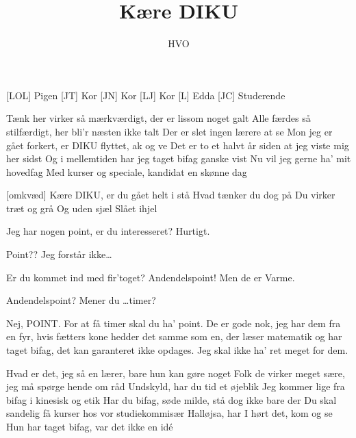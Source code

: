 \documentclass[a4paper,11pt]{article}
\title{Kære DIKU}
\author{HVO}
\begin{document}
\maketitle

\begin{roles}
[LOL] Pigen
[JT] Kor
[JN] Kor
[LJ] Kor
[L] Edda
[JC] Studerende
\end{roles}

\begin{song}

 Tænk her virker så mærkværdigt, der er lissom noget galt
  Alle færdes så stilfærdigt, her bli'r næsten ikke talt
  Der er slet ingen lærere at se
  Mon jeg er gået forkert, er DIKU flyttet, ak og ve
  Det er to et halvt år siden at jeg viste mig her sidst
  Og i mellemtiden har jeg taget bifag ganske vist
  Nu vil jeg gerne ha' mit hovedfag
  Med kurser og speciale, kandidat en skønne dag

[omkvæd] Kære DIKU, er du gået helt i stå
  Hvad tænker du dog på
  Du virker træt og grå
  Og uden sjæl
  Slået ihjel

\end{song}

\begin{sketch}


 Jeg har nogen point, er du interesseret?  Hurtigt.

 Point?? Jeg forstår ikke\ldots

 Er du kommet ind med fir'toget?  Andendelspoint!  Men de er Varme.

 Andendelspoint?  Mener du \ldots timer?

 Nej, POINT.  For at få timer skal du ha' point.  De er gode nok, jeg har dem fra en fyr, hvis fætters kone hedder det samme som en, der læser matematik og har taget bifag, det kan garanteret ikke opdages.  Jeg skal ikke ha' ret meget for dem.


\end{sketch}

\begin{song}

 Hvad er det, jeg så en lærer, bare hun kan gøre noget
  Folk de virker meget sære, jeg må spørge hende om råd
  Undskyld, har du tid et øjeblik
  Jeg kommer lige fra bifag i kinesisk og etik
  Har du bifag, søde milde, stå dog ikke bare der
  Du skal sandelig få kurser hos vor studiekommisær
  Halløjsa, har I hørt det, kom og se
  Hun har taget bifag, var det ikke en idé

\end{song}
\end{document}
